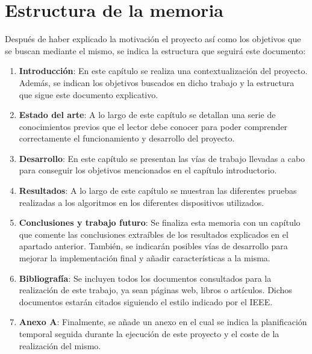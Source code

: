 \section{Estructura de la memoria}\label{sec:estructura}

Después de haber explicado la motivación el proyecto así como los objetivos que se buscan mediante el mismo, se indica la estructura que seguirá este documento:

\begin{enumerate}
    \item \textbf{Introducción}: En este capítulo se realiza una contextualización del proyecto. Además, se indican los objetivos buscados en dicho trabajo y la estructura que sigue este documento explicativo.
    \item \textbf{Estado del arte}: A lo largo de este capítulo se detallan una serie de conocimientos previos que el lector debe conocer para poder comprender correctamente el funcionamiento y desarrollo del proyecto.
    \item \textbf{Desarrollo}: En este capítulo se presentan las vías de trabajo llevadas a cabo para conseguir los objetivos mencionados en el capítulo introductorio.
    \item \textbf{Resultados}: A lo largo de este capítulo se muestran las diferentes pruebas realizadas a los algoritmos en los diferentes dispositivos utilizados.
    \item \textbf{Conclusiones y trabajo futuro}: Se finaliza esta memoria con un capítulo que comente las conclusiones extraíbles de los resultados explicados en el apartado anterior. También, se indicarán posibles vías de desarrollo para mejorar la implementación final y añadir características a la misma.
    \item \textbf{Bibliografía}: Se incluyen todos los documentos consultados para la realización de este trabajo, ya sean páginas web, libros o artículos. Dichos documentos estarán citados siguiendo el estilo indicado por el \ac{IEEE}.
    \item \textbf{Anexo A}: Finalmente, se añade un anexo en el cual se indica la planificación temporal seguida durante la ejecución de este proyecto y el coste de la realización del mismo.
\end{enumerate}





